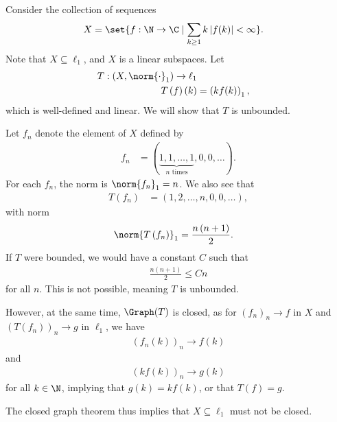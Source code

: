 \documentclass[10pt]{mypackage}
\begin{document}
  \begin{example}
    Consider the collection of sequences
    \begin{align*}
      X &= \set{f: \N\rightarrow\C\mid \sum_{k\geq 1}k\left\vert f(k) \right\vert < \infty}.
    \end{align*}
    Note that $X\subseteq \ell_1$, and $X$ is a linear subspaces. Let
    \begin{align*}
      T: \left(X,\norm{\cdot}_1\right) \rightarrow \ell_1\\
      T\left(f\right)\left(k\right) &= \left(kf(k)\right)_1,
    \end{align*}
    which is well-defined and linear. We will show that $T$ is unbounded.\newline

    Let $f_n$ denote the element of $X$ defined by
    \begin{align*}
      f_n &= (\underbrace{1,1,\dots,1}_{\text{$n$ times}},0,0,\dots).
    \end{align*}
    For each $f_n$, the norm is $\norm{f_n}_1 = n$. We also see that
    \begin{align*}
      T\left(f_n\right) &= \left(1,2,\dots,n,0,0,\dots\right),
    \end{align*}
    with norm
    \begin{align*}
      \norm{T\left(f_n\right)}_1 &= \frac{n\left(n+1\right)}{2}.
    \end{align*}
    If $T$ were bounded, we would have a constant $C$ such that
    \begin{align*}
      \frac{n\left(n+1\right)}{2}\leq Cn
    \end{align*}
    for all $n$. This is not possible, meaning $T$ is unbounded.\newline

    However, at the same time, $\Graph(T)$ is closed, as for $\left(f_n\right)_n\rightarrow f$ in $X$ and $\left(T\left(f_n\right)\right)_n\rightarrow g$ in $\ell_1$, we have
    \begin{align*}
      \left(f_n\left(k\right)\right)_n\rightarrow f(k)
    \end{align*}
    and
    \begin{align*}
      \left(kf(k)\right)_n\rightarrow g(k)
    \end{align*}
    for all $k\in \N$, implying that $g(k) = kf(k)$, or that $T\left(f\right) = g$.\newline

    The closed graph theorem thus implies that $X\subseteq \ell_1$ must not be closed.
  \end{example}
\end{document}
